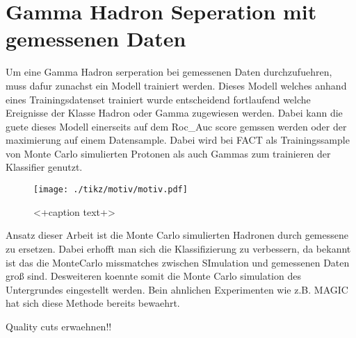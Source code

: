 \chapter{Gamma Hadron Seperation mit gemessenen Daten}
Um eine Gamma Hadron serperation bei gemessenen Daten durchzufuehren, muss dafur zunachst ein Modell trainiert werden. 
Dieses Modell welches anhand eines Trainingsdatenset trainiert wurde entscheidend fortlaufend welche Ereignisse der Klasse Hadron oder Gamma zugewiesen werden.
Dabei kann die guete dieses Modell einerseits auf dem Roc\_Auc score gemssen werden oder der maximierung auf einem Datensample. 
Dabei wird bei FACT als Trainingssample von Monte Carlo simulierten Protonen als auch Gammas zum trainieren der Klassifier genutzt.
\begin{figure}[H]
  \centering
  \texttt{[image: ./tikz/motiv/motiv.pdf]}
  \caption{<+caption text+>}
  \label{fig:<+label+>}
\end{figure}
Ansatz dieser Arbeit ist die Monte Carlo simulierten Hadronen durch gemessene zu ersetzen. 
Dabei erhofft man sich die Klassifizierung zu verbessern, da bekannt ist das die MonteCarlo missmatches zwischen SImulation und gemessenen Daten groß sind. 
Desweiteren koennte somit die Monte Carlo simulation des Untergrundes eingestellt werden. 
Bein ahnlichen Experimenten wie z.B. MAGIC hat sich diese Methode bereits bewaehrt. 

Quality cuts erwaehnen!!

